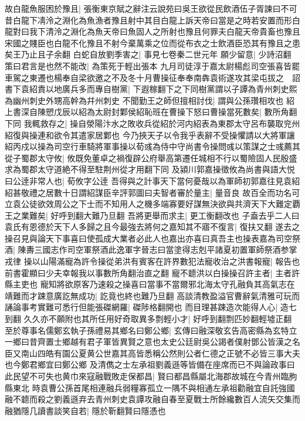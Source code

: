 故白龍魚服困於豫且|{
	張衡東京賦之辭注云說苑曰吳王欲從民飲酒伍子胥諫曰不可昔白龍下凊泠之淵化為魚漁者豫且射中其目白龍上訴天帝曰當是之時若安置而形白龍對曰我下清泠之淵化為魚天帝曰魚固人之所射也豫且何罪夫白龍天帝貴畜也豫且宋國之賤臣也白龍不化豫且不射今棄萬乘之位而從布衣之士飲酒臣恐其有豫且之患矣王乃止且子余翻}
白蛇自放劉季害之|{
	事見七卷秦二世元年}
願少留意|{
	少詩沼翻}
策曰君言是也然不能改|{
	為策死于輕出張本}
九月司徒淳于嘉太尉楊彪司空張喜皆罷　車駕之東遷也楊奉自梁欲邀之不及冬十月曹操征奉奉南犇袁術遂攻其梁屯拔之　詔書下袁紹責以地廣兵多而專自樹黨|{
	下遐稼翻下之下同樹黨謂以子譚為青州刺史熙為幽州刺史外甥高幹為幷州刺史}
不聞勤王之師但擅相討伐|{
	謂與公孫瓚相攻也}
紹上書深自陳愬戊辰以紹為太尉封鄴侯紹恥班在曹操下怒曰曹操當死數矣|{
	數所角翻下同}
我輒救存之|{
	操自滎陽汴水之敗收兵從紹於河内紹表為東郡太守呂布襲取兖州紹復與操連和欲令其遣家居鄴也}
今乃挾天子以令我乎表辭不受操懼請以大將軍讓紹丙戍以操為司空行車騎將軍事操以荀彧為侍中守尚書令操問彧以策謀之士彧薦其從子蜀郡太守攸|{
	攸既免董卓之禍復辟公府舉高第遷任城相不行以蜀險固人民殷盛求為蜀郡太守道絶不得至駐荆州從才用翻下同}
及潁川郭嘉操徵攸為尚書與語大悦曰公逹非常人也|{
	荀攸字公逹}
吾得與之計事天下當何憂哉以為軍師初郭嘉往見袁紹紹甚敬禮之居數十日謂紹謀臣辛評郭圖曰夫智者審於量主|{
	量音良}
故百全而功名可立袁公徒欲效周公之下士而不知用人之機多端寡要好謀無決欲與共濟天下大難定覇王之業難矣|{
	好呼到翻大難乃旦翻}
吾將更舉而求主|{
	更工衡翻改也}
子盍去乎二人曰袁氏有恩德於天下人多歸之且今最強去將何之嘉知其不寤不復言|{
	復扶又翻}
遂去之操召見與論天下事喜曰使孤成大業者必此人也嘉出亦喜曰真吾主也操表嘉為司空祭酒|{
	陳夀三國志作司空軍祭酒此逸軍字晉志曰當塗得志剋平諸夏初置軍師祭酒参掌戎律}
操以山陽滿寵為許令操從弟洪有賓客在許界數犯法寵收治之洪書報寵|{
	報告也前書霍顯曰少夫幸報我以事數所角翻治直之翻}
寵不聼洪以白操操召許主者|{
	主者許縣主吏也}
寵知將欲原客乃速殺之操喜曰當事不當爾邪北海太守孔融負其高氣志在靖難而才踈意廣訖無成功|{
	訖竟也終也難乃旦翻}
高談清教盈溢官曹辭氣清雅可玩而誦論事考實難可悉行但能張磔網羅|{
	磔陟格翻開也}
而目理甚踈造次能得人心|{
	造七到翻}
久久亦不願附也其所任用好奇取異多剽輕小才|{
	好呼到翻剽匹妙翻輕墟正翻}
至於尊事名儒鄭玄執子孫禮易其鄉名曰鄭公鄉|{
	玄傳曰融深敬玄告高密縣為玄特立一鄉曰昔齊置士鄉越有君子軍皆異賢之意也太史公廷尉吳公謁者僕射鄧公皆漢之名臣又南山四皓有園公夏黄公世嘉其高皆悉稱公然則公者仁德之正號不必皆三事大夫也今鄭君鄉宜曰鄭公鄉}
及清儁之士左承祖劉義遜等皆備在座席而已不與論政事曰此民望不可失也黄巾來寇融戰敗走保都昌|{
	賢曰都昌縣屬北海郡故城在今青州臨朐縣東北}
時袁曹公孫首尾相連融兵弱糧寡孤立一隅不與相通左承祖勸融宜自託強國融不聼而殺之劉義遜弃去青州刺史袁譚攻融自春至夏戰士所餘纔數百人流矢交集而融猶隱几讀書談笑自若|{
	隱於靳翻賢曰隱憑也}
